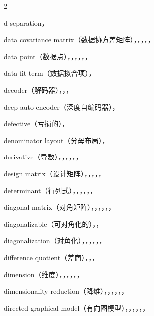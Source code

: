 \begin{multicols}{2}
\medskip{}\par\smallskip
\noindent d-separation，\par
\noindent data covariance matrix（数据协方差矩阵），，，，，\par
\noindent data point（数据点），，，，，，\par
\noindent data-fit term（数据拟合项），\par
\noindent decoder（解码器），，，\par
\noindent deep auto-encoder（深度自编码器），\par
\noindent defective（亏损的），\par
\noindent denominator layout（分母布局），\par
\noindent derivative（导数），，，，，，\par
\noindent design matrix（设计矩阵），，，，，\par
\noindent determinant（行列式），，，，，，\par
\noindent diagonal matrix（对角矩阵），，，，，，\par
\noindent diagonalizable（可对角化的），，\par
\noindent diagonalization（对角化），，，，，，\par
\noindent difference quotient（差商），，，\par
\noindent dimension（维度），，，，，，\par
\noindent dimensionality reduction（降维），，，，，，\par
\noindent directed graphical model（有向图模型），，，，，，\par

\end{multicols}
